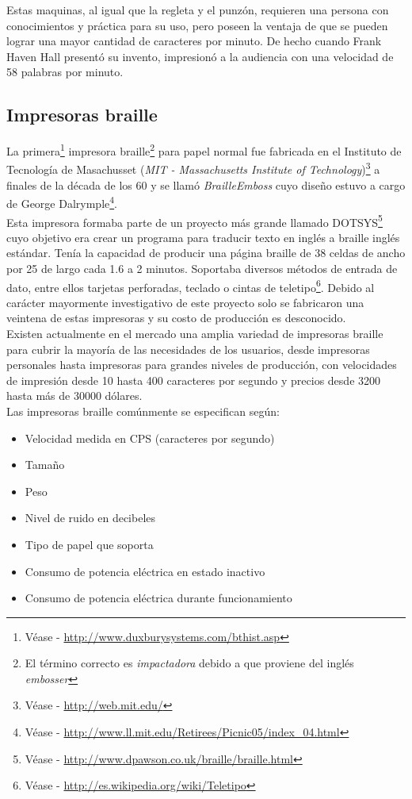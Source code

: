 Estas maquinas, al igual que la regleta y el punz\'on, requieren una persona
con conocimientos y pr\'actica para su uso, pero poseen la ventaja de que se
pueden lograr una mayor cantidad de caracteres por minuto. De hecho cuando
Frank Haven Hall present\'o su invento, impresion\'o a la audiencia con una
velocidad de 58 palabras por minuto.



\subsection{Impresoras braille}
%
La primera\footnote{V\'ease - \url{http://www.duxburysystems.com/bthist.asp}}
impresora braille\footnote{El t\'ermino correcto es \emph{impactadora} debido a
que proviene del ingl\'es \emph{embosser}} para papel normal fue fabricada en
el Instituto de Tecnolog\'ia de Masachusset (\emph{MIT - Massachusetts
Institute
of Technology})\footnote{V\'ease - \url{http://web.mit.edu/}} a finales de la
d\'ecada de los 60 y se llam\'o \emph{BrailleEmboss} cuyo dise\~no estuvo a
cargo
de George Dalrymple\footnote{V\'ease - \url{
http://www.ll.mit.edu/Retirees/Picnic05/index_04.html}}.\\

Esta impresora formaba parte de un proyecto m\'as grande llamado
DOTSYS\footnote{V\'ease - \url{http://www.dpawson.co.uk/braille/braille.html}}
cuyo objetivo era crear un programa para traducir texto en ingl\'es a braille
ingl\'es est\'andar. 
Ten\'ia la capacidad de producir una p\'agina braille de 38
celdas de ancho por 25 de largo cada 1.6 a 2 minutos.
Soportaba diversos m\'etodos de entrada de dato, entre ellos tarjetas
perforadas, teclado o cintas de teletipo\footnote{V\'ease -
\url{http://es.wikipedia.org/wiki/Teletipo}}. Debido al car\'acter mayormente
investigativo de este proyecto solo se fabricaron una veintena de estas
impresoras y su costo de producci\'on es desconocido.\\

Existen actualmente en el mercado una amplia variedad de impresoras braille
para cubrir la mayor\'ia de las necesidades de los usuarios, desde impresoras
personales hasta impresoras para grandes niveles de producci\'on, con
velocidades de impresi\'on desde 10 hasta 400 caracteres por segundo y
precios desde 3200 hasta m\'as de 30000 d\'olares.\\

Las impresoras braille com\'unmente se especifican seg\'un:

\begin{itemize}
 \item Velocidad medida en CPS (caracteres por segundo)
 \item Tama\~no
 \item Peso
 \item Nivel de ruido en decibeles
 \item Tipo de papel que soporta
 \item Consumo de potencia el\'ectrica en estado inactivo
 \item Consumo de potencia el\'ectrica durante funcionamiento
\end{itemize}


